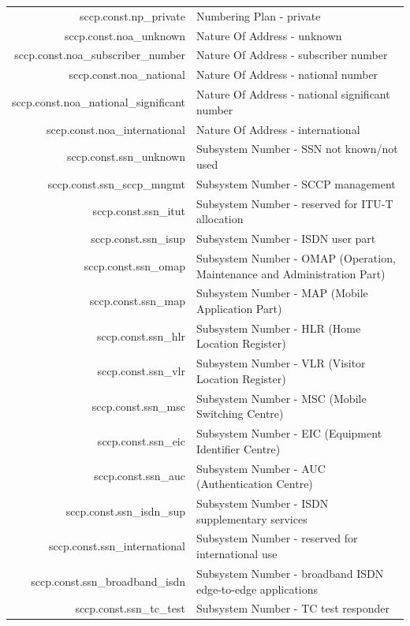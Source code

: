 \documentclass[a4paper,latin]{paper}
\begin{document}
\noindent\begin{tabularx}{\linewidth}{ | >{\ttfamily} r | >{\ttfamily} X |}
	\hline
	sccp.const.np\_private				& Numbering Plan - private\\
	sccp.const.noa\_unknown				& Nature Of Address - unknown\\
	sccp.const.noa\_subscriber\_number		& Nature Of Address - subscriber number\\
	sccp.const.noa\_national			& Nature Of Address - national number\\
	sccp.const.noa\_national\_significant		& Nature Of Address - national significant number\\
	sccp.const.noa\_international			& Nature Of Address - international\\
	sccp.const.ssn\_unknown				& Subsystem Number - SSN not known/not used\\
	sccp.const.ssn\_sccp\_mngmt			& Subsystem Number - SCCP management\\
	sccp.const.ssn\_itut				& Subsystem Number - reserved for ITU-T allocation\\
	sccp.const.ssn\_isup				& Subsystem Number - ISDN user part\\
	sccp.const.ssn\_omap				& Subsystem Number - OMAP (Operation, Maintenance and Administration Part)\\
	sccp.const.ssn\_map				& Subsystem Number - MAP (Mobile Application Part)\\
	sccp.const.ssn\_hlr				& Subsystem Number - HLR (Home Location Register)\\
	sccp.const.ssn\_vlr				& Subsystem Number - VLR (Visitor Location Register)\\
	sccp.const.ssn\_msc				& Subsystem Number - MSC (Mobile Switching Centre)\\
	sccp.const.ssn\_eic				& Subsystem Number - EIC (Equipment Identifier Centre)\\
	sccp.const.ssn\_auc				& Subsystem Number - AUC (Authentication Centre)\\
	sccp.const.ssn\_isdn\_sup			& Subsystem Number - ISDN supplementary services\\	
	sccp.const.ssn\_international			& Subsystem Number - reserved for international use\\
	sccp.const.ssn\_broadband\_isdn			& Subsystem Number - broadband ISDN edge-to-edge applications\\
	sccp.const.ssn\_tc\_test			& Subsystem Number - TC test responder\\
	\hline
\end{tabularx}%
\end{document}
